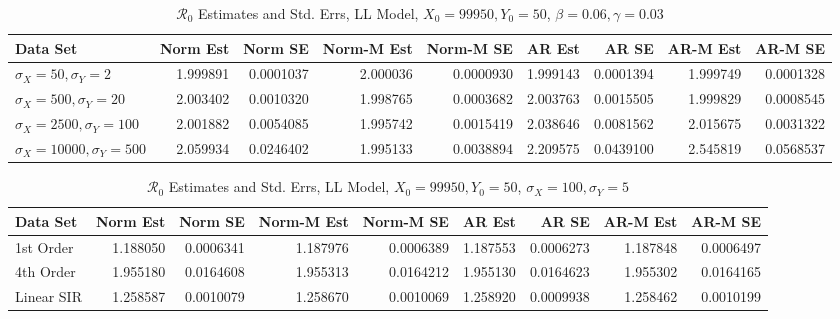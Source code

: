 \documentclass[12pt]{article}
\newcommand{\rr}{\ensuremath{\mathcal{R}_0}}
\begin{document}
\begin{table}[H]
	
	\caption{\label{tab:}$\rr$ Estimates and Std. Errs, LL Model,
		$X_0 = 99950, Y_0 = 50$, $\beta = 0.06, \gamma = 0.03$}
	\centering
	\begin{footnotesize}
		\begin{tabular}[t]{l|r|r|r|r|r|r|r|r}
			\hline
			Data Set & Norm Est & Norm SE & Norm-M Est & Norm-M SE & AR Est & AR SE & AR-M Est & AR-M SE\\
			\hline
			$\sigma_X = 50, \sigma_Y = 2$ & 1.999891 & 0.0001037 & 2.000036 & 0.0000930 & 1.999143 & 0.0001394 & 1.999749 & 0.0001328\\
			\hline
			$\sigma_X = 500, \sigma_Y = 20$ & 2.003402 & 0.0010320 & 1.998765 & 0.0003682 & 2.003763 & 0.0015505 & 1.999829 & 0.0008545\\
			\hline
			$\sigma_X = 2500, \sigma_Y = 100$ & 2.001882 & 0.0054085 & 1.995742 & 0.0015419 & 2.038646 & 0.0081562 & 2.015675 & 0.0031322\\
			\hline
			$\sigma_X = 10000, \sigma_Y = 500$ & 2.059934 & 0.0246402 & 1.995133 & 0.0038894 & 2.209575 & 0.0439100 & 2.545819 & 0.0568537\\
			\hline
		\end{tabular}
	\end{footnotesize}
\end{table}

\begin{table}[H]
	
	\caption{\label{tab:}$\rr$ Estimates and Std. Errs, LL Model,
		$X_0 = 99950, Y_0 = 50$, $\sigma_X = 100, \sigma_Y = 5$}
	\centering
	\begin{footnotesize}
		\begin{tabular}[t]{l|r|r|r|r|r|r|r|r}
			\hline
			Data Set & Norm Est & Norm SE & Norm-M Est & Norm-M SE & AR Est & AR SE & AR-M Est & AR-M SE\\
			\hline
			1st Order & 1.188050 & 0.0006341 & 1.187976 & 0.0006389 & 1.187553 & 0.0006273 & 1.187848 & 0.0006497\\
			\hline
			4th Order & 1.955180 & 0.0164608 & 1.955313 & 0.0164212 & 1.955130 & 0.0164623 & 1.955302 & 0.0164165\\
			\hline
			Linear SIR & 1.258587 & 0.0010079 & 1.258670 & 0.0010069 & 1.258920 & 0.0009938 & 1.258462 & 0.0010199\\
			\hline
		\end{tabular}
	\end{footnotesize}
\end{table}
\end{document}
